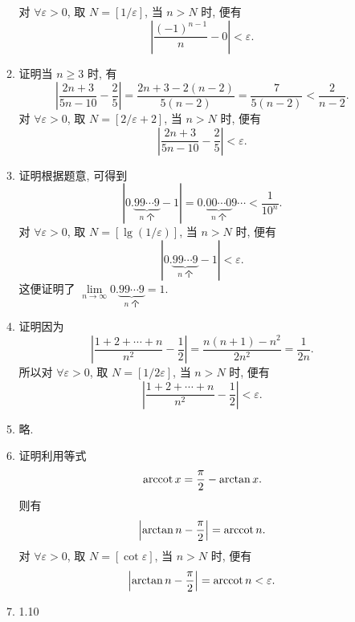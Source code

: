 \begin{enumerate}
\begin{enumerate}[(1)]
\[                \]
                对 $\forall\varepsilon > 0$, 取 $N = [1/\varepsilon]$, 当 $n > N$ 时, 便有
                \[
                    \left|\frac{(-1)^{n-1}}{n} - 0\right| < \varepsilon.   
                \]
            \item %
                {\heiti 证明}\quad 当 $n \geqslant 3$ 时, 有
                \[
                    \left|\frac{2n+3}{5n-10} - \frac25\right| = \frac{2n+3-2(n-2)}{5(n-2)} = \frac{7}{5(n-2)} < \frac{2}{n-2}.    
                \]
                对 $\forall\varepsilon > 0$, 取 $N = [2/\varepsilon + 2]$, 当 $n > N$ 时, 便有
                \[
                    \left|\frac{2n+3}{5n-10} - \frac25\right| < \varepsilon.   
                \]
            \item %
                {\heiti 证明}\quad 根据题意, 可得到
                \[
                    |0.\underbrace{99\cdots9}_{\text{$n$ 个}} - 1| = 0.\underbrace{00\cdots0}_{\text{$n$ 个}}9\cdots < \frac{1}{10^n}.    
                \]
                对 $\forall\varepsilon > 0$, 取 $N = [\lg(1/\varepsilon)]$, 当 $n > N$ 时, 便有
                \[
                    |0.\underbrace{99\cdots9}_{\text{$n$ 个}} - 1| < \varepsilon.   
                \]
                这便证明了 $\lim\limits_{n\to\infty}0.\underbrace{99\cdots9}_{\text{$n$ 个}} = 1$.
            \item %
                {\heiti 证明}\quad 因为
                \[
                    \left|\frac{1+2+\cdots+n}{n^2} - \frac12\right| = \frac{n(n+1)-n^2}{2n^2} = \frac{1}{2n}.    
                \]
                所以对 $\forall\varepsilon > 0$, 取 $N = [1/2\varepsilon]$, 当 $n > N$ 时, 便有
                \[
                    \left|\frac{1+2+\cdots+n}{n^2} - \frac12\right| < \varepsilon.   
                \]
            \item %
                略.
            \item %
                {\heiti 证明}\quad 利用等式
                \[
                    \mathrm{arccot}\, x = \frac{\pi}{2} - \arctan x.    
                \]
                则有
                \[
                    \left|\arctan n - \frac{\pi}{2}\right| = \mathrm{arccot}\, n.    
                \]
                对 $\forall\varepsilon > 0$, 取 $N = [\cot\varepsilon]$, 当 $n > N$ 时, 便有
                \[
                    \left|\arctan n - \frac{\pi}{2}\right| = \mathrm{arccot}\, n < \varepsilon.   
                \]
            \item 1.10

\end{enumerate}
\end{enumerate}
